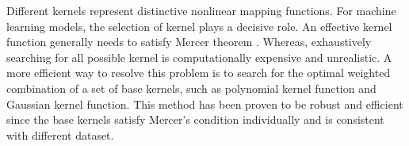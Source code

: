 







Different kernels represent distinctive nonlinear mapping functions. For machine learning models, the selection of kernel plays a decisive role. An effective kernel function generally needs to satisfy Mercer theorem \cite{cristianini2000introduction}. 
Whereas, exhaustively searching for all possible kernel is computationally expensive and unrealistic\cite{chapelle1999support}. A more efficient way to resolve this problem is to search for the optimal weighted combination of a set of base kernels, such as polynomial kernel function and Gaussian kernel function\cite{lanckriet2002robust}. This method has been proven to be robust and efficient since the base kernels satisfy Mercer’s condition individually and is consistent with different dataset\cite{jebara2004multi}.

